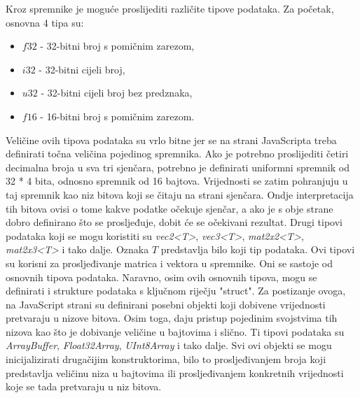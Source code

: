 \documentclass{foi}
\begin{document}
Kroz spremnike je moguće proslijediti različite tipove podataka. Za početak, osnovna 4 tipa su:

\begin{itemize}
	\item $f32$ - 32-bitni broj s pomičnim zarezom,
	\item $i32$ - 32-bitni cijeli broj,
	\item $u32$ - 32-bitni cijeli broj bez predznaka,
	\item $f16$ - 16-bitni broj s pomičnim zarezom.

\end{itemize}

Veličine ovih tipova podataka su vrlo bitne jer se na strani JavaScripta treba definirati točna veličina pojedinog spremnika. 
Ako je potrebno proslijediti četiri decimalna broja u sva tri sjenčara, potrebno je definirati uniformni spremnik od 32 * 4 bita, odnosno spremnik od 16 bajtova. Vrijednosti se zatim pohranjuju u taj spremnik kao niz bitova koji se čitaju na strani sjenčara. Ondje interpretacija tih bitova ovisi o tome kakve podatke očekuje sjenčar, a ako je s obje strane dobro definirano što se prosljeđuje, dobit će se očekivani rezultat. Drugi tipovi podataka koji se mogu koristiti su \textit{vec2<T>}, \textit{vec3<T>}, \textit{mat2x2<T>}, \textit{mat2x3<T>} i tako dalje. Oznaka $T$ predstavlja bilo koji tip podataka. Ovi tipovi su korisni za prosljeđivanje matrica i vektora u spremnike. Oni se sastoje od osnovnih tipova podataka. Naravno, osim ovih osnovnih tipova, mogu se definirati i strukture podataka s ključnom riječju "struct". Za postizanje ovoga, na JavaScript strani su definirani posebni objekti koji dobivene vrijednosti pretvaraju u nizove bitova. Osim toga, daju pristup pojedinim svojstvima tih nizova kao što je dobivanje veličine u bajtovima i slično. Ti tipovi podataka su \textit{ArrayBuffer}, \textit{Float32Array}, \textit{UInt8Array} i tako dalje. Svi ovi objekti se mogu inicijalizirati drugačijim konstruktorima, bilo to prosljeđivanjem broja koji predstavlja veličinu niza u bajtovima ili prosljeđivanjem konkretnih vrijednosti koje se tada pretvaraju u niz bitova. 
\end{document}
